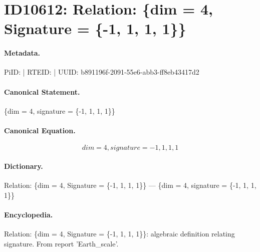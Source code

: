 \section*{ID10612: Relation: \{dim = 4, Signature = \{-1, 1, 1, 1\}\}}
\paragraph{Metadata.}
PiID:  | RTEID:  | UUID: b891196f-2091-55e6-abb3-ff8eb43417d2

\paragraph{Canonical Statement.}
\{dim = 4, signature = \{-1, 1, 1, 1\}\}

\paragraph{Canonical Equation.}
\[
{dim = 4, signature = {-1, 1, 1, 1}}
\]

\paragraph{Dictionary.}
Relation: \{dim = 4, Signature = \{-1, 1, 1, 1\}\} — \{dim = 4, signature = \{-1, 1, 1, 1\}\}

\paragraph{Encyclopedia.}
Relation: \{dim = 4, Signature = \{-1, 1, 1, 1\}\}: algebraic definition relating signature. From report 'Earth\_scale'.
